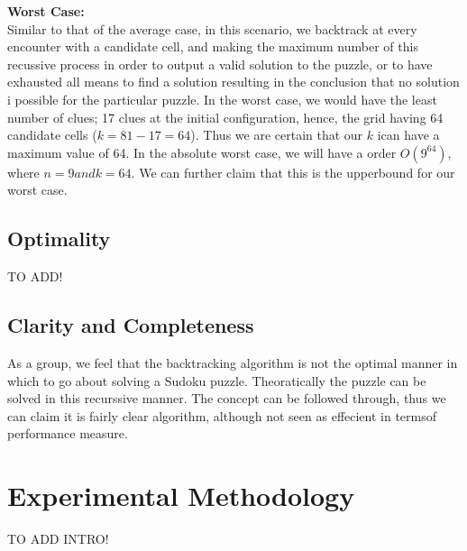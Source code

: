 \documentclass[12pt]{article}
\begin{document}
\begin{flushleft}
\textbf{Worst Case:}\\
Similar to that of the average case, in this scenario, we backtrack at every encounter with a candidate cell, and making the maximum number of this recussive process in order to output a valid solution to the puzzle, or to have exhausted all means to find a solution resulting in the conclusion that no solution i possible for the particular puzzle. In the worst case, we would have the least number of clues; 17 clues at the initial configuration, hence, the grid having 64 candidate cells ($k = 81-17 = 64$). Thus we are certain that our $k$ ican have a maximum value of 64. In the absolute worst case, we will have a order $O(9^64)$, where $n = 9 and k = 64$. We can further claim that this is the upperbound for our worst case.  
\end{flushleft}
\subsection{Optimality}
\begin{flushleft}
TO ADD!
\end{flushleft}

\subsection{Clarity and Completeness}
\begin{flushleft}
As a group, we feel that the backtracking algorithm is not the optimal manner in which to go about solving a Sudoku puzzle. Theoratically the puzzle can be solved in this recurssive manner. The concept can be followed through, thus we can claim it is fairly clear algorithm, although not seen as effecient in termsof performance measure. 
\end{flushleft}

\section{Experimental Methodology}
TO ADD INTRO!
\end{document}

